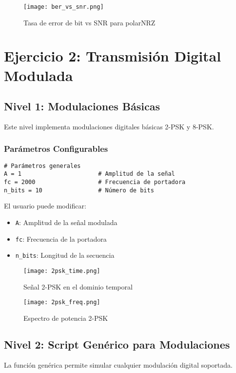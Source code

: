 \documentclass[12pt,a4paper]{article}
\begin{document}
\begin{figure}[H]
    \centering
    \texttt{[image: ber\_vs\_snr.png]}
    \caption{Tasa de error de bit vs SNR para polarNRZ}
\end{figure}

\section{Ejercicio 2: Transmisión Digital Modulada}

\subsection{Nivel 1: Modulaciones Básicas}
Este nivel implementa modulaciones digitales básicas 2-PSK y 8-PSK.

\subsubsection{Parámetros Configurables}
\begin{lstlisting}[caption=Parámetros del Nivel 1]
# Parámetros generales
A = 1                      # Amplitud de la señal
fc = 2000                  # Frecuencia de portadora
n_bits = 10                # Número de bits
\end{lstlisting}

El usuario puede modificar:
\begin{itemize}
    \item \texttt{A}: Amplitud de la señal modulada
    \item \texttt{fc}: Frecuencia de la portadora
    \item \texttt{n\_bits}: Longitud de la secuencia
\end{itemize}

\begin{figure}[H]
    \centering
    \texttt{[image: 2psk\_time.png]}
    \caption{Señal 2-PSK en el dominio temporal}
\end{figure}

\begin{figure}[H]
    \centering
    \texttt{[image: 2psk\_freq.png]}
    \caption{Espectro de potencia 2-PSK}
\end{figure}

\subsection{Nivel 2: Script Genérico para Modulaciones}
La función genérica permite simular cualquier modulación digital soportada.
\end{document}
